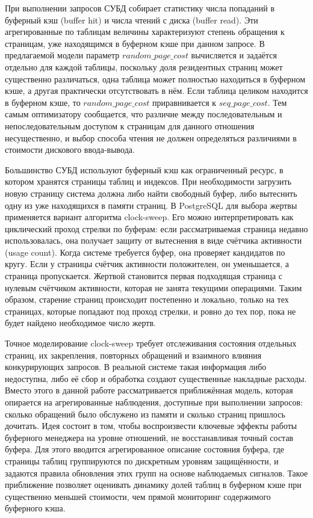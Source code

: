 При выполнении запросов СУБД собирает статистику числа попаданий в буферный кэш (buffer hit) и числа чтений с диска (buffer read). Эти агрегированные по таблицам величины характеризуют степень обращения к страницам, уже находящимся в буферном кэше при данном запросе. В предлагаемой модели параметр \(random\_page\_cost\) вычисляется и задаётся отдельно для каждой таблицы, поскольку доля резидентных страниц может существенно различаться, одна таблица может полностью находиться в буферном кэше, а другая практически отсутствовать в нём. Если таблица целиком находится в буферном кэше, то \(random\_page\_cost\) приравнивается к \(seq\_page\_cost\). Тем самым оптимизатору сообщается, что различие между последовательным и непоследовательным доступом к страницам для данного отношения несущественно, и выбор способа чтения не должен определяться различиями в стоимости дискового ввода-вывода.

Большинство СУБД используют буферный кэш как ограниченный ресурс, в котором хранятся страницы таблиц и индексов. При необходимости загрузить новую страницу система должна либо найти свободный буфер, либо вытеснить одну из уже находящихся в памяти страниц. В PostgreSQL для выбора жертвы применяется вариант алгоритма clock-sweep. Его можно интерпретировать как циклический проход стрелки по буферам: если рассматриваемая страница недавно использовалась, она получает защиту от вытеснения в виде счётчика активности (usage count). Когда системе требуется буфер, она проверяет кандидатов по кругу. Если у страницы счётчик активности положителен, он уменьшается, а страница пропускается. Жертвой становится первая подходящая страница с нулевым счётчиком активности, которая не занята текущими операциями. Таким образом, старение страниц происходит постепенно и локально, только на тех страницах, которые попадают под проход стрелки, и ровно до тех пор, пока не будет найдено необходимое число жертв.

Точное моделирование clock-sweep требует отслеживания состояния отдельных страниц, их закрепления, повторных обращений и взаимного влияния конкурирующих запросов. В реальной системе такая информация либо недоступна, либо её сбор и обработка создают существенные накладные расходы. Вместо этого в данной работе рассматривается приближённая модель, которая опирается на агрегированные наблюдения, доступные при выполнении запросов: сколько обращений было обслужено из памяти и сколько страниц пришлось дочитать. Идея состоит в том, чтобы воспроизвести ключевые эффекты работы буферного менеджера на уровне отношений, не восстанавливая точный состав буфера. Для этого вводится агрегированное описание состояния буфера, где страницы таблиц группируются по дискретным уровням защищённости, и задаются правила обновления этих групп на основе наблюдаемых сигналов. Такое приближение позволяет оценивать динамику долей таблиц в буферном кэше при существенно меньшей стоимости, чем прямой мониторинг содержимого буферного кэша.

